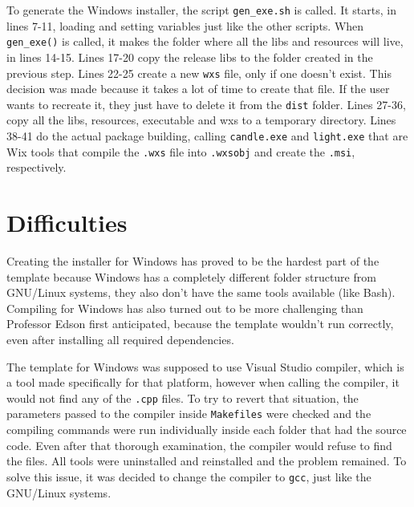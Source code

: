 

To generate the Windows installer, the script \texttt{gen\_exe.sh} is called. It starts, in lines 7-11, loading and setting variables just like the other scripts. When \texttt{gen\_exe()} is called, it makes the folder where all the libs and resources will live, in lines 14-15. Lines 17-20 copy the release libs to the folder created in the previous step. Lines 22-25 create a new \texttt{wxs} file, only if one doesn't exist. This decision was made because it takes a lot of time to create that file. If the user wants to recreate it, they just have to delete it from the \texttt{dist} folder. Lines 27-36, copy all the libs, resources, executable and wxs to a temporary directory. Lines 38-41 do the actual package building, calling \texttt{candle.exe} and \texttt{light.exe} that are Wix tools that compile the \texttt{.wxs} file into \texttt{.wxsobj} and create the \texttt{.msi}, respectively.




\section{Difficulties}
\label{sec:difficulties}

Creating the installer for Windows has proved to be the hardest part of the template because Windows has a completely different folder structure from GNU/Linux systems, they also don't have the same tools available (like Bash). Compiling for Windows has also turned out to be more challenging than Professor Edson first anticipated, because the template wouldn't run correctly, even after installing all required dependencies.

The template for Windows was supposed to use Visual Studio compiler, which is a tool made specifically for that platform, however when calling the compiler, it would not find any of the \texttt{.cpp} files. To try to revert that situation, the parameters passed to the compiler inside \texttt{Makefiles} were checked and the compiling commands were run individually inside each folder that had the source code. Even after that thorough examination, the compiler would refuse to find the files. All tools were uninstalled and reinstalled and the problem remained. To solve this issue, it was decided to change the compiler to \texttt{gcc}, just like the GNU/Linux systems.

